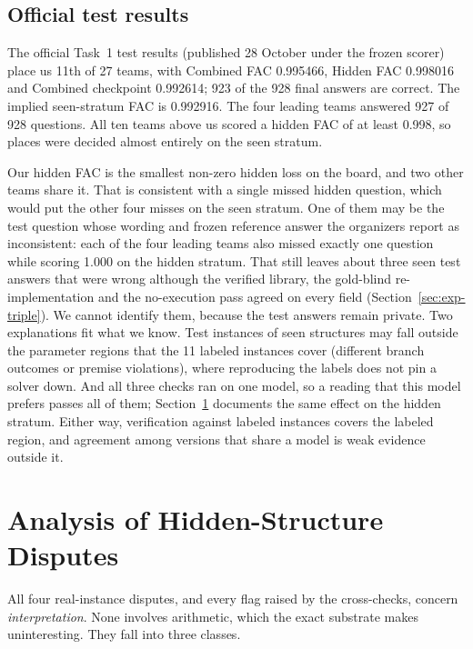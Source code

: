 \documentclass[conference]{IEEEtran}
\begin{document}
\subsection{Official test results}\label{sec:exp-official}
The official Task~1 test results (published 28 October under the frozen scorer) place us 11th of 27 teams, with
Combined FAC 0.995466, Hidden FAC 0.998016 and Combined checkpoint 0.992614; 923 of the 928 final answers are
correct. The implied seen-stratum FAC is 0.992916. The four leading teams answered 927 of 928 questions. All ten teams
above us scored a hidden FAC of at least 0.998, so places were decided almost entirely on the seen stratum.

Our hidden FAC is the smallest non-zero hidden loss on the board, and two other teams share it. That is consistent
with a single missed hidden question, which would put the other four misses on the seen stratum. One of them may be the
test question whose wording and frozen reference answer the organizers report as inconsistent: each of the four
leading teams also missed exactly one question while scoring 1.000 on the hidden stratum. That still leaves about three
seen test answers that were wrong although the verified library, the gold-blind re-implementation and the no-execution
pass agreed on every field (Section~\ref{sec:exp-triple}). We cannot identify them, because the test answers remain
private. Two explanations fit what we know. Test instances of seen structures may fall outside the parameter regions
that the 11 labeled instances cover (different branch outcomes or premise violations), where reproducing the labels
does not pin a solver down. And all three checks ran on one model, so a reading that this model prefers passes all of
them; Section~\ref{sec:disputes} documents the same effect on the hidden stratum. Either way, verification against
labeled instances covers the labeled region, and agreement among versions that share a model is weak evidence outside
it.

\section{Analysis of Hidden-Structure Disputes}\label{sec:disputes}
All four real-instance disputes, and every flag raised by the cross-checks, concern \emph{interpretation}. None
involves arithmetic, which the exact substrate makes uninteresting. They fall into three classes.
\end{document}
